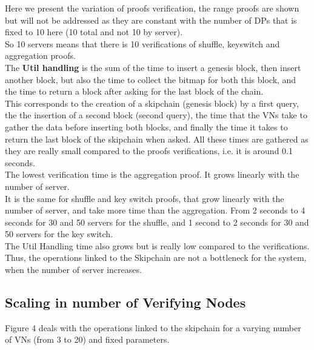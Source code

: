 \documentclass{article}
\begin{document}
Here we present the variation of proofs verification, the range proofs are shown but will not be addressed as they are constant with the number of DPs that is fixed to 10 here (10 total and not 10 by server).\\
So 10 servers means that there is 10 verifications of shuffle, keyswitch and aggregation proofs.\\
The \textbf{Util handling} is the sum of the time to insert a genesis block, then insert another block, but also the time to collect the bitmap for both this block, and the time to return a block after asking for the last block of the chain.\\
This corresponds to the creation of a skipchain (genesis block) by a first query, the the insertion of a second block (second query), the time that the VNs take to gather the data before inserting both blocks, and finally the time it takes to return the last block of the skipchain when asked. All these times are gathered as they are really small compared to the proofs verifications, i.e. it is around 0.1 seconds.\\
The lowest verification time is the aggregation proof. It grows linearly with the number of server.\\
It is the same for shuffle and key switch proofs, that grow linearly with the number of server, and take more time than the aggregation. From 2 seconds to 4 seconds for 30 and 50 servers for the shuffle, and 1 second to 2 seconds for 30 and 50 servers for the key switch.\\
The Util Handling time also grows but is really low compared to the verifications. Thus, the operations linked to the Skipchain are not a bottleneck for the system, when the number of server increases.

\subsection{Scaling in number of Verifying Nodes}
Figure 4 deals with the operations linked to the skipchain for a varying number of VNs (from 3 to 20) and fixed parameters.
\end{document}
